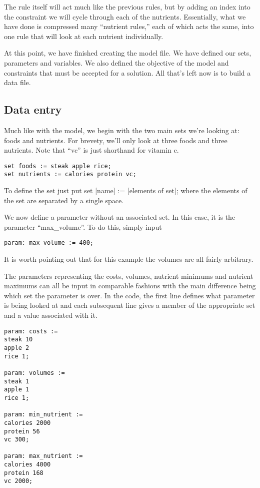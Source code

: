 \documentclass{article}
\begin{document}
The rule itself will act much like the previous rules, but by adding an index into the constraint we will cycle through each of the nutrients.  Essentially, what we have done is compressed many ``nutrient rules,'' each of which acts the same, into one rule that will look at each nutrient individually.

At this point, we have finished creating the model file.  We have defined our sets, parameters and variables.  We also defined the objective of the model and constraints that must be accepted for a solution.  All that's left now is to build a data file.


\subsection*{Data entry}

Much like with the model, we begin with the two main sets we're looking at: foods and nutrients.  For brevety, we'll only look at three foods and three nutrients.  Note that ``vc'' is just shorthand for vitamin c.

\begin{verbatim}
set foods := steak apple rice;
set nutrients := calories protein vc;
\end{verbatim}

To define the set just put set [name] := [elements of set]; where the elements of the set are separated by a single space.

We now define a parameter without an associated set.  In this case, it is the parameter ``max\_volume''.  To do this, simply input

\begin{verbatim}
param: max_volume := 400;
\end{verbatim}

\noindent
It is worth pointing out that for this example the volumes are all fairly arbitrary.

The parameters representing the costs, volumes, nutrient minimums and nutrient maximums can all be input in comparable fashions with the main difference being which set the parameter is over.  In the code, the first line defines what parameter is being looked at and each subsequent line gives a member of the appropriate set and a value associated with it.

\begin{verbatim}
param: costs :=
steak 10
apple 2
rice 1;

param: volumes :=
steak 1
apple 1
rice 1;

param: min_nutrient :=
calories 2000
protein 56
vc 300;

param: max_nutrient :=
calories 4000
protein 168
vc 2000;
\end{verbatim}
\end{document}
